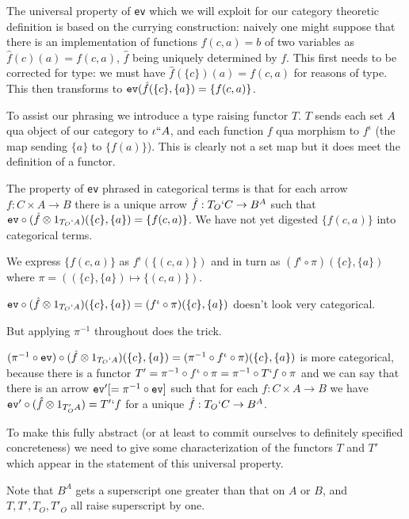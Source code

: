 \documentclass[12pt]{article}
\begin{document}
The universal property of {\tt ev} which we will exploit for our category theoretic definition is based on the currying construction:  naively one might suppose
that there is an implementation of functions $f(c,a) = b$ of two variables as $\hat f(c)(a) = f(c,a)$, $\hat f$ being uniquely determined by $f$.  This first needs to be corrected
for type:  we must have $\hat f(\{c\})(a) = f(c,a)$ for reasons of type.  This then transforms to ${\tt ev}(\hat f(\{c\},\{a\}) = \{f(c,a)\}$.

To assist our phrasing we introduce a type raising functor $T$.  $T$ sends each set $A$ qua object of our category to $\iota ``A$, and each function $f$ qua morphism
to $f^{\iota}$ (the map sending $\{a\}$ to $\{f(a)\}$).   This is clearly not a set map but it does meet the definition of a functor.

The property of {\tt ev} phrased in categorical terms is that for each arrow $f:C \times A \rightarrow B$ there is a unique arrow $\hat f:  T_O`C \rightarrow B^A$
such that ${\tt ev}\circ (\hat f \otimes 1_{T_O`A})(\{c\},\{a\}) = \{f(c,a)\}$.  We have not yet digested $\{f(c,a)\}$ into categorical terms. 

We express $\{f(c,a)\}$ as $f^\iota(\{(c,a)\})$ and in turn as $(f^\iota \circ \pi)(\{c\},\{a\})$ where $\pi = ((\{c\},\{a\}) \mapsto \{(c,a)\})$.

${\tt ev}\circ (\hat f \otimes 1_{T_O`A})(\{c\},\{a\}) = (f^\iota \circ \pi)(\{c\},\{a\})$ doesn't look very categorical.

But applying $\pi^{-1}$ throughout does the trick.

$(\pi^{-1}\circ {\tt ev})\circ (\hat f \otimes 1_{T_O`A})(\{c\},\{a\}) = (\pi^{-1} \circ f^\iota \circ \pi)(\{c\},\{a\})$ is more categorical, because
there is a functor $T' = \pi^{-1}\circ f^\iota \circ \pi = \pi^{-1} \circ T`f \circ \pi$ and we can say that there is an arrow ${\tt ev'} [= \pi^{-1} \circ {\tt ev}]$
such that for each $f:C \times A \rightarrow B$ we have ${\tt ev'}\circ (\hat f \otimes 1_{T_O'A}) = T'`f$ for a unique $\hat f:T_O`C \rightarrow B^A$. 

To make this fully abstract (or at least to commit ourselves to definitely specified concreteness) we need to give some characterization of the functors $T$ and
$T'$ which appear in the statement of this universal property.

Note that $B^A$ gets a superscript one greater than that on $A$ or $B$, and $T, T', T_O, T'_O$ all raise superscript by one.
\end{document}
